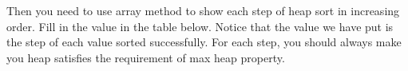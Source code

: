 
\begin{minipage}{1\textwidth}
\centering
{}
\end{minipage}%

Then you need to use array method to show each step of heap sort in increasing order. Fill in the value in the table below. Notice that the value we have put is the step of each value sorted successfully. For each step, you should always make you heap satisfies the requirement of max heap property.


